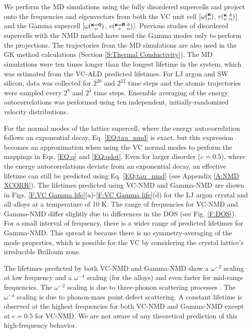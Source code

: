 We perform the MD simulations using the fully disordered supercells  
and project onto the frequencies and eigenvectors 
from both the VC unit cell [$\omega\mspace{-4.0mu}\left(\mspace{-8.0mu} \begin{smallmatrix}&\pmb{\kappa} \\&\nu\end{smallmatrix} \mspace{-3.0mu}\right)$, $e\mspace{-4.0mu}\left(\mspace{-8.0mu} \begin{smallmatrix} &\pmb{\kappa} &b \\ &\nu &\alpha\end{smallmatrix} \mspace{-3.0mu}\right)$] and the 
Gamma supercell [$\omega\mspace{-4.0mu}\left(\mspace{-8.0mu} \begin{smallmatrix}&\pmb{\kappa}=\mathbf{0} \\&\nu\end{smallmatrix} \mspace{-3.0mu}\right)$, $e\mspace{-4.0mu}\left(\mspace{-8.0mu} \begin{smallmatrix} &\pmb{\kappa}=\pmb{0} &b \\ &\nu &\alpha\end{smallmatrix}\mspace{-3.0mu}\right)$]. Previous studies of 
disordered supercells with the 
NMD method have used the Gamma modes only to perform the projections.
\cite{donadio_atomistic_2009,he_heat_2011,he_morphology_2011,
he_lattice_2012,hori_phonon_2013} 
The trajectories from 
the MD simulations are also used in the GK method calculations
(Section \ref{S:Thermal Conductivity}). 
The MD simulations were ten times longer than the 
longest lifetime in the system, which was  
estimated from the VC-ALD predicted lifetimes. For LJ 
argon and SW silicon, data was collected for $2^{20}$ and 
$2^{22}$ time steps and the atomic trajectories were sampled 
every $2^8$ and $2^4$ time steps. 
Ensemble averaging of the energy autocorrelations was performed 
using ten independent, initially-randomized velocity distributions. 

For the normal modes of the lattice supercell, where the energy 
autocorrelation follows an 
exponential decay,\cite{ladd_lattice_1986,turney_predicting_2009-1} 
Eq. \eqref{EQ:tau_nmd} is exact, but this expression becomes an 
approximation when 
using the VC normal modes to perform the mappings in Eqs.  
\eqref{EQ:q} and \eqref{EQ:qdot}. 
Even for larger disorder ($c=0.5$),  
where the energy autocorrelations 
deviate from an exponential decay, 
an effective lifetime can still be predicted 
using Eq. \eqref{EQ:tau_nmd} (see Appendix \ref{A:NMD XCORR}). 
The lifetimes predicted using VC-NMD and Gamma-NMD  
are shown in Figs. \ref{F:VC Gamma life}(a)-\ref{F:VC Gamma life}(d) 
for the LJ argon crystal and all alloys at a temperature of 10 K. 
The range of frequencies for 
VC-NMD and Gamma-NMD differ slightly due to differences in 
the DOS (see Fig. \ref{F:DOS}). 
For a small interval of frequency, there is a wider range of 
predicted lifetimes for Gamma-NMD. This spread is because there 
is no symmetry-averaging of the mode properties, 
which is possible for the VC by considering the crystal 
lattice's irreducible Brillouin zone.\cite{ashcroft_solid_1976} 

The lifetimes predicted by both VC-NMD and Gamma-NMD 
show a $\omega^{-2}$ scaling at low frequency and a $\omega^{-4}$ 
scaling (for the alloys) and 
even faster for mid-range frequencies. The $\omega^{-2}$ scaling 
is due to three-phonon scattering processes
\cite{callaway_model_1959,maradudin_scattering_1962}. The 
$\omega^{-4}$ scaling is due to phonon-mass point defect 
scattering.\cite{klemens_scattering_1955,klemens_thermal_1957,
mattis_phonon_1957,tamura_isotope_1983} 
A constant lifetime is observed at the highest frequencies  
for both VC-NMD and Gamma-NMD except at $c=0.5$ for VC-NMD. We are not 
aware of any theoretical prediction of this high-frequency behavior.

